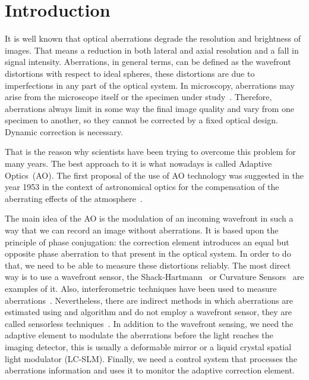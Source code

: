 \section{Introduction}
\label{sec:Introduction}

It is well known that optical aberrations degrade the resolution and brightness of images. That means a reduction in both lateral and axial resolution and a fall in signal intensity. Aberrations, in general terms, can be defined as the wavefront distortions with respect to ideal spheres, these distortions are due to imperfections in any part of the optical system. In microscopy, aberrations may arise from the microscope itself or the specimen under study~\cite{AOM_basic_ref}. Therefore, aberrations always limit in some way the final image quality and vary from one specimen to another, so they cannot be corrected by a fixed optical design. Dynamic correction is necessary. 
 
That is the reason why scientists have been trying to overcome this problem for many years. The best approach to it is what nowadays is called Adaptive Optics~(AO).
The first proposal of the use of AO technology was suggested in the year 1953 in the context of astronomical optics for the compensation of the aberrating effects of the atmosphere~\cite{Babcock1953}.

The main idea of the AO is the modulation of an incoming wavefront in such a way that we can record an image without aberrations. It is based upon the principle of phase conjugation: the correction element introduces an equal but opposite phase aberration to that present in the optical system. In order to do that, we need to be able to measure these distortions reliably. The most direct way is to use a wavefront sensor, the Shack-Hartmann~\cite{Principles_HS, History_HS} or Curvature Sensors~\cite{Curvature_Sensor_1st_Paper} are examples of it. Also, interferometric techniques have been used to measure aberrations~\cite{Interferometric_methods}. Nevertheless, there are indirect methods in which aberrations are estimated using and algorithm and do not employ a wavefront sensor, they are called sensorless techniques~\cite{WF_sensorless}. 
In addition to the wavefront sensing, we need the adaptive element to modulate the aberrations before the light reaches the imaging detector, this is usually a deformable mirror or a liquid crystal spatial light modulator (LC-SLM). Finally, we need a control system that processes the aberrations information and uses it to monitor the adaptive correction element.

